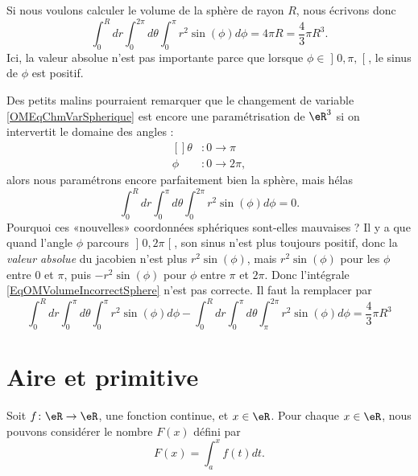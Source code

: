 Si nous voulons calculer le volume de la sphère de rayon $R$, nous écrivons donc
\begin{equation}
	\int_0^Rdr\int_{0}^{2\pi}d\theta\int_0^{\pi}r^2 \sin(\phi)d\phi=4\pi R=\frac{ 4 }{ 3 }\pi R^3.
\end{equation}
Ici, la valeur absolue n'est pas importante parce que lorsque $\phi\in\mathopen] 0,\pi ,  \mathclose[$, le sinus de $\phi$ est positif.

Des petits malins pourraient remarquer que le changement de variable \eqref{OMEqChmVarSpherique} est encore une paramétrisation de $\eR^3$ si on intervertit le domaine des angles : 
\begin{equation}
	\begin{aligned}[]
		\theta&\colon 0 \to \pi\\
		\phi	&\colon 0\to 2\pi,
	\end{aligned}
\end{equation}
alors nous paramétrons encore parfaitement bien la sphère, mais hélas
\begin{equation}		\label{EqOMVolumeIncorrectSphere}
	\int_0^Rdr\int_{0}^{\pi}d\theta\int_0^{2\pi}r^2 \sin(\phi)d\phi=0.
\end{equation}
Pourquoi ces «nouvelles» coordonnées sphériques sont-elles mauvaises ? Il y a que quand l'angle $\phi$ parcours $\mathopen] 0 , 2\pi \mathclose[$, son sinus n'est plus toujours positif, donc la \emph{valeur absolue} du jacobien n'est plus $r^2\sin(\phi)$, mais $r^2\sin(\phi)$ pour les $\phi$ entre $0$ et $\pi$, puis $-r^2\sin(\phi)$ pour $\phi$ entre $\pi$ et $2\pi$. Donc l'intégrale \eqref{EqOMVolumeIncorrectSphere} n'est pas correcte. Il faut la remplacer par
\begin{equation}
	\int_0^Rdr\int_{0}^{\pi}d\theta\int_0^{\pi}r^2 \sin(\phi)d\phi- \int_0^Rdr\int_{0}^{\pi}d\theta\int_{\pi}^{2\pi}r^2 \sin(\phi)d\phi = \frac{ 4 }{ 3 }\pi R^3
\end{equation}

\section{Aire et primitive}

Soit $f\colon \eR\to \eR$, une fonction continue, et $x\in\eR$. Pour chaque $x\in\eR$, nous pouvons considérer le nombre $F(x)$ défini par
\begin{equation}
	F(x)=\int_a^x f(t)dt.
\end{equation}

